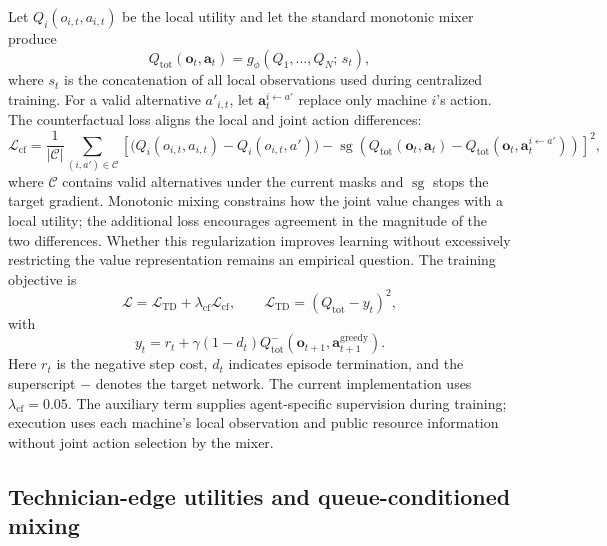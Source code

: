 \documentclass[11pt]{article}
\begin{document}
Let $Q_i(o_{i,t},a_{i,t})$ be the local utility and let the standard monotonic mixer produce
\begin{equation}
Q_{\mathrm{tot}}(\mathbf{o}_t,\mathbf{a}_t)
=g_\phi\!\left(Q_1,\ldots,Q_N;\,s_t\right),
\end{equation}
where $s_t$ is the concatenation of all local observations used during centralized training. For a valid alternative $a'_{i,t}$, let $\mathbf{a}^{i\leftarrow a'}_t$ replace only machine $i$'s action. The counterfactual loss aligns the local and joint action differences:
\begin{equation}
\mathcal{L}_{\mathrm{cf}}=
\frac{1}{|\mathcal{C}|}\sum_{(i,a')\in\mathcal{C}}
\left[
\bigl(Q_i(o_{i,t},a_{i,t})-Q_i(o_{i,t},a')\bigr)
-\operatorname{sg}\!\left(
Q_{\mathrm{tot}}(\mathbf{o}_t,\mathbf{a}_t)-
Q_{\mathrm{tot}}(\mathbf{o}_t,\mathbf{a}^{i\leftarrow a'}_t)
\right)
\right]^2,
\end{equation}
where $\mathcal{C}$ contains valid alternatives under the current masks and $\operatorname{sg}$ stops the target gradient. Monotonic mixing constrains how the joint value changes with a local utility; the additional loss encourages agreement in the magnitude of the two differences. Whether this regularization improves learning without excessively restricting the value representation remains an empirical question. The training objective is
\begin{equation}
\mathcal{L}=\mathcal{L}_{\mathrm{TD}}+\lambda_{\mathrm{cf}}\mathcal{L}_{\mathrm{cf}},
\qquad
\mathcal{L}_{\mathrm{TD}}=(Q_{\mathrm{tot}}-y_t)^2,
\end{equation}
with
\begin{equation}
y_t=r_t+\gamma(1-d_t)Q^{-}_{\mathrm{tot}}
(\mathbf{o}_{t+1},\mathbf{a}^{\mathrm{greedy}}_{t+1}).
\end{equation}
Here $r_t$ is the negative step cost, $d_t$ indicates episode termination, and the superscript $-$ denotes the target network. The current implementation uses $\lambda_{\mathrm{cf}}=0.05$. The auxiliary term supplies agent-specific supervision during training; execution uses each machine's local observation and public resource information without joint action selection by the mixer.

\subsection{Technician-edge utilities and queue-conditioned mixing}
\end{document}
